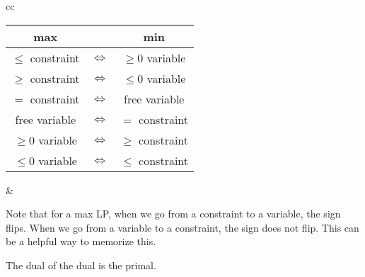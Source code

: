 \documentclass[a4paper]{report}
\begin{document}
\begin{note}
  \begin{tabular}{cc}
    \begin{minipage}{.5\linewidth}
    \begin{tabular}{|c|c|c|}
    \hline
    \textbf{max} & & \textbf{min} \\
    \hline
    $\leq$ constraint & $\iff$ & $\geq 0$ variable \\
    \hline  
    $\geq$ constraint & $\iff$ & $\leq 0$ variable \\ 
    \hline
    $=$ constraint & $\iff$ & free variable \\
    \hline
    \hline
    free variable & $\iff$ & $=$ constraint \\
    \hline
    $\geq 0$ variable & $\iff$ & $\geq$ constraint \\
    \hline   
    $\leq 0$ variable & $\iff$ & $\leq$ constraint \\
    \hline
  \end{tabular}
\end{minipage} &
\begin{minipage}{.5\linewidth}
  Note that for a max LP, when we go from a constraint to a variable, the sign flips. When we go from a variable to a constraint, the sign does not flip. This can be a helpful way to memorize this.
\end{minipage}%
\end{tabular}
\end{note}

\begin{remark}
  The dual of the dual is the primal.
\end{remark}
\end{document}
